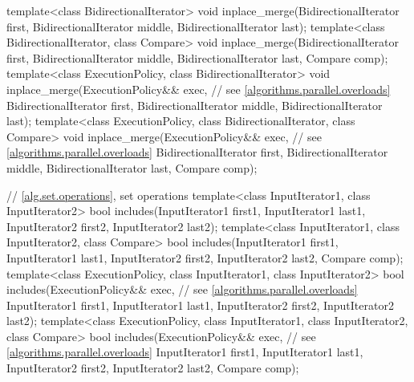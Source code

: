 \begin{codeblock}
{  template<class BidirectionalIterator>
    void inplace_merge(BidirectionalIterator first,
                       BidirectionalIterator middle,
                       BidirectionalIterator last);
  template<class BidirectionalIterator, class Compare>
    void inplace_merge(BidirectionalIterator first,
                       BidirectionalIterator middle,
                       BidirectionalIterator last, Compare comp);
  template<class ExecutionPolicy, class BidirectionalIterator>
    void inplace_merge(ExecutionPolicy&& exec, // see \ref{algorithms.parallel.overloads}
                       BidirectionalIterator first,
                       BidirectionalIterator middle,
                       BidirectionalIterator last);
  template<class ExecutionPolicy, class BidirectionalIterator, class Compare>
    void inplace_merge(ExecutionPolicy&& exec, // see \ref{algorithms.parallel.overloads}
                       BidirectionalIterator first,
                       BidirectionalIterator middle,
                       BidirectionalIterator last, Compare comp);

  // \ref{alg.set.operations}, set operations
  template<class InputIterator1, class InputIterator2>
    bool includes(InputIterator1 first1, InputIterator1 last1,
                  InputIterator2 first2, InputIterator2 last2);
  template<class InputIterator1, class InputIterator2, class Compare>
    bool includes(InputIterator1 first1, InputIterator1 last1,
                  InputIterator2 first2, InputIterator2 last2, Compare comp);
  template<class ExecutionPolicy, class InputIterator1, class InputIterator2>
    bool includes(ExecutionPolicy&& exec, // see \ref{algorithms.parallel.overloads}
                  InputIterator1 first1, InputIterator1 last1,
                  InputIterator2 first2, InputIterator2 last2);
  template<class ExecutionPolicy, class InputIterator1, class InputIterator2, class Compare>
    bool includes(ExecutionPolicy&& exec, // see \ref{algorithms.parallel.overloads}
                  InputIterator1 first1, InputIterator1 last1,
                  InputIterator2 first2, InputIterator2 last2, Compare comp);

}
\end{codeblock}

